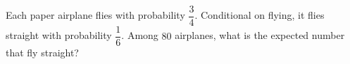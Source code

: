 Each paper airplane flies with probability $\dfrac{3}{4}$. Conditional on flying, it flies straight with probability $\dfrac{1}{6}$. Among $80$ airplanes, what is the expected number that fly straight?
